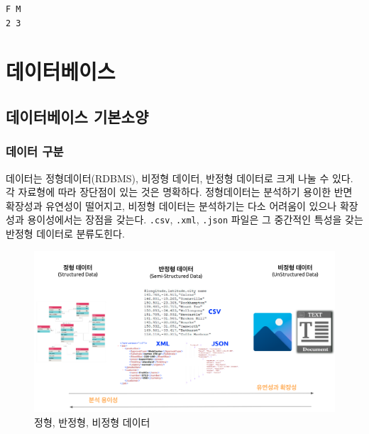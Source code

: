 \documentclass[
  letterpaper,
  chapter,a4paper,showtrims,openright,hidelinks]{oblivoir}
\begin{document}
\begin{verbatim}
F M 
2 3 
\end{verbatim}

\hypertarget{uxb370uxc774uxd130uxbca0uxc774uxc2a4}{%
\chapter{데이터베이스}\label{uxb370uxc774uxd130uxbca0uxc774uxc2a4}}

\hypertarget{uxb370uxc774uxd130uxbca0uxc774uxc2a4-uxae30uxbcf8uxc18cuxc591}{%
\section{데이터베이스
기본소양}\label{uxb370uxc774uxd130uxbca0uxc774uxc2a4-uxae30uxbcf8uxc18cuxc591}}

\hypertarget{classify-data}{%
\subsection{데이터 구분}\label{classify-data}}

데이터는 정형데이터(RDBMS), 비정형 데이터, 반정형 데이터로 크게 나눌 수
있다. 각 자료형에 따라 장단점이 있는 것은 명확하다. 정형데이터는
분석하기 용이한 반면 확장성과 유연성이 떨어지고, 비정형 데이터는
분석하기는 다소 어려움이 있으나 확장성과 용이성에서는 장점을 갖는다.
\texttt{.csv}, \texttt{.xml}, \texttt{.json} 파일은 그 중간적인 특성을
갖는 반정형 데이터로 분류도힌다.

\begin{figure}

{\centering \includegraphics{images/database_classification.png}

}

\caption{정형, 반정형, 비정형 데이터}

\end{figure}
\end{document}
